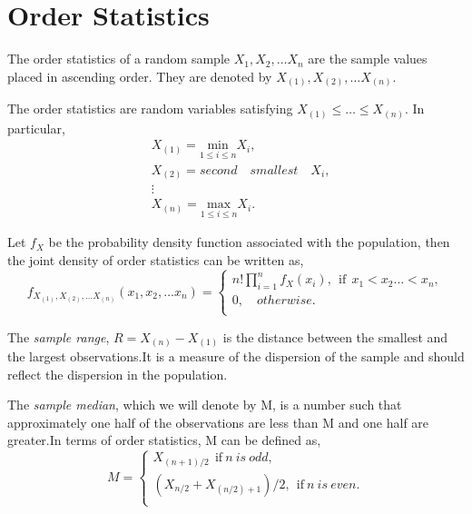 \documentclass[a4paper,english,12pt]{article}
\begin{document}
\section{Order Statistics}
\begin{defn}
The order statistics of a random sample $X_1,X_2, \dots X_n$ are the sample values placed in ascending order. They are denoted by $X_{(1)},X_{(2)},\dots X_{(n)}$.
\end{defn}
The order statistics are random variables satisfying $X_{(1)}\leq\dots\leq X_{(n)}$. In particular,
\begin{align}
& X_{(1)}=\underset{1\leq i\leq n}{\text{min}} X_i ,\nonumber \\ 
& X_{(2)}=second\quad smallest\quad X_i,\\ \nonumber
& \vdots \\ \nonumber
& X_{(n)}=\underset{1\leq i\leq n}{\text{max}} X_i.
\end{align}
\begin{thm}
Let $f_X$ be the probability density function associated with the population, then the joint density of order statistics can be written as,
\begin{equation}
f_{X_{(1)},X_{(2)},\dots X_{(n)}}(x_1,x_2, \ldots x_n)= 
		\begin{cases}
		n!\prod\limits_{i=1}^n f_X (x_i),~~\mbox{if}~~x_1<x_2 \ldots <x_n,\\
		0,\quad otherwise.\\
		\end{cases}
\end{equation}
\end{thm}
\begin{defn}
The \textit{sample range}, $R=X_{(n)}-X_{(1)}$ is the distance between the smallest and the largest observations.It is a measure of the dispersion of the sample and should reflect the dispersion in the population.
\end{defn}
\begin{defn}
The \textit{sample median}, which we will denote by M, is a number such that approximately one half of the observations are less than M and one half are greater.In terms of order statistics, M can be defined as,
\begin{equation}
M= 
		\begin{cases}
	 X_{(n+1)/2}~~\mbox{if}~n~is~odd,\\
	(X_{n/2}+X_{(n/2)+1})/2,~~\mbox{if}~n~is~even.\\
		\end{cases}
\end{equation}
\end{defn}
\end{document}
